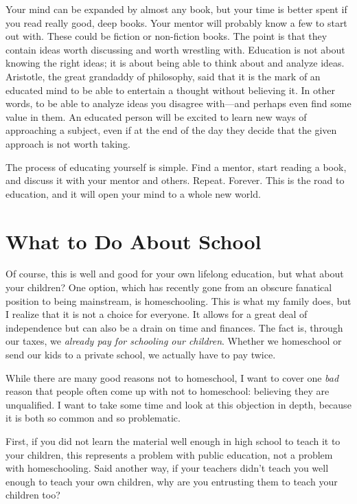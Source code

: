 Your mind can be expanded by almost any book, but your time is better
spent if you read really good, deep books. Your mentor will probably
know a few to start out with. These
could be fiction or
non-fiction books. The point is that they contain ideas worth
discussing and worth wrestling with. Education is not about knowing the
right ideas; it is about being able to think about and analyze ideas.
Aristotle, the great grandaddy of philosophy, said that it is the mark
of an educated mind to be able to entertain a thought without believing
it. In other words, to be able to analyze ideas you disagree with—and
perhaps even find some value in them. An educated person will be
excited to learn new ways of approaching a subject, even if at the end
of the day they decide that the given approach is not worth taking.

The process of educating yourself is simple. Find a mentor, start
reading a book, and discuss it with
your mentor and
others. Repeat. Forever. This is the road to education, and it will
open your mind to a whole new world. 

\section{What to Do About School}

Of course, this is well and good for your own lifelong education, but
what about your children?  One option, which has recently gone from an
obscure fanatical position to being mainstream, is homeschooling. This
is what my family does, but I realize that it is not a choice for
everyone. It allows for a great deal of independence but can also be a
drain on time and finances. The fact is, through our taxes, we
\textit{already pay for schooling our children}.
Whether we homeschool
or send our kids to a
private school, we actually have to pay twice. 

While there are many good reasons not to homeschool, I want to cover one
\textit{bad} reason that people often come up with not to homeschool:
believing they are
unqualified.  I want to take some time and look at this objection in
depth, because it is both so common and so problematic. 

First, if you did not
learn the material well enough in high school to teach it to your
children, this represents a problem with public education, not a
problem with homeschooling.
Said another way, if
your teachers didn’t teach you well enough to teach your own children,
why are you entrusting them to teach your children too?  

